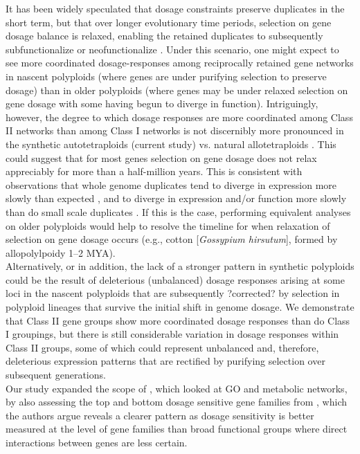 \documentclass[11pt]{article}
\begin{document}
It has been widely speculated that dosage constraints preserve duplicates in the short term, but that over longer evolutionary time periods, selection on gene dosage balance is relaxed, enabling the retained duplicates to subsequently subfunctionalize or neofunctionalize \citep{coate2011, schnable2012, conant2014, coate2016}.
Under this scenario, one might expect to see more coordinated dosage-responses among reciprocally retained gene networks in nascent polyploids (where genes are under purifying selection to preserve dosage) than in older polyploids (where genes may be under relaxed selection on gene dosage with some having begun to diverge in function).
Intriguingly, however, the degree to which dosage responses are more coordinated among Class II networks than among Class I networks is not discernibly more pronounced in the synthetic autotetraploids (current study) vs. natural allotetraploids \citep{coate2016}.
This could suggest that for most genes selection on gene dosage does not relax appreciably for more than a half-million years.
This is consistent with observations that whole genome duplicates tend to diverge in expression more slowly than expected \citep{rodgers2012, tasdighian2017}, and to diverge in expression and/or function more slowly than do small scale duplicates \citep{hakes2007, qiao2018, wang2011, rodgers2012, defoort2019}.
If this is the case, performing equivalent analyses on older polyploids would help to resolve the timeline for when relaxation of selection on gene dosage occurs (e.g., cotton [\textit{Gossypium hirsutum}], formed by allopolylpoidy 1--2 MYA).\\

Alternatively, or in addition, the lack of a stronger pattern in synthetic polyploids could be the result of deleterious (unbalanced) dosage responses arising at some loci in the nascent polyploids that are subsequently ?corrected? by selection in polyploid lineages that survive the initial shift in genome dosage.
We demonstrate that Class II gene groups show more coordinated dosage responses than do Class I groupings, but there is still considerable variation in dosage responses within Class II groups, some of which could represent unbalanced and, therefore, deleterious expression patterns that are rectified by purifying selection over subsequent generations.\\

Our study expanded the scope of \cite{coate2016}, which looked at GO and metabolic networks, by also assessing the top and bottom dosage sensitive gene families from \cite{tasdighian2017}, which the authors argue reveals a clearer pattern as dosage sensitivity is better measured at the level of gene families than broad functional groups where direct interactions between genes are less certain.\\
\end{document}
